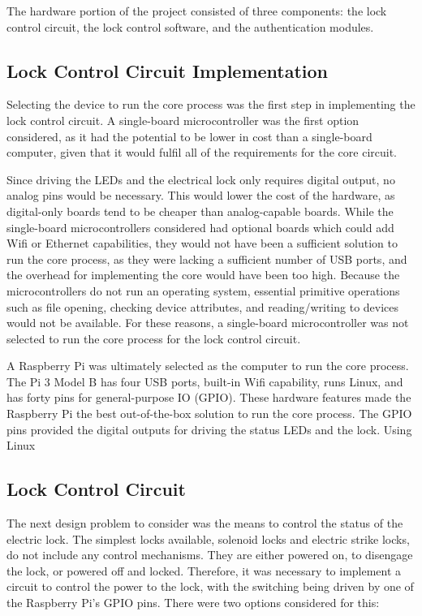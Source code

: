 \documentclass[12pt]{report}
\let\Oldsubsection\subsection
\renewcommand{\subsection}{\FloatBarrier\Oldsubsection}
\begin{document}
The hardware portion of the project consisted of three components: the lock control circuit, the lock control software, 
and the authentication modules.

\subsection{Lock Control Circuit Implementation} \label{section:lock-control-circuit-implementation}

Selecting the device to run the core process was the first step in implementing the lock control circuit. A 
single-board microcontroller was the first option considered, as it had the potential to be lower in cost than a 
single-board computer, given that it would fulfil all of the requirements for the core circuit.

Since driving the LEDs and the electrical lock only requires digital output, no analog pins would be necessary. This 
would lower the cost of the hardware, as digital-only boards tend to be cheaper than analog-capable boards. While 
the single-board microcontrollers considered had optional boards which could add Wifi or Ethernet capabilities, they 
would not have been a sufficient solution to run the core process, as they were lacking a sufficient number of USB 
ports, and the overhead for implementing the core would have been too high. Because the microcontrollers do not run an 
operating system, essential primitive operations such as file opening, checking device attributes, and reading/writing
to devices would not be available. For these reasons, a single-board microcontroller was not selected to run the core 
process for the lock control circuit.

A Raspberry Pi was ultimately selected as the computer to run the core process. The Pi 3 Model B has four USB ports, 
built-in Wifi capability, runs Linux, and has forty pins for general-purpose IO (GPIO). These hardware features made the
Raspberry Pi the best out-of-the-box solution to run the core process. The GPIO pins provided the digital outputs for 
driving the status LEDs and the lock. Using Linux 

\subsection{Lock Control Circuit} \label{lock-control-circuit}

The next design problem to consider was the means to control the status of the electric lock. The simplest locks 
available, solenoid locks and electric strike locks, do not include any control mechanisms. They are either powered on, 
to disengage the lock, or powered off and locked. Therefore, it was necessary to implement a circuit to control the
power to the lock, with the switching being driven by one of the Raspberry Pi's GPIO pins. There were two options
considered for this:
\end{document}
